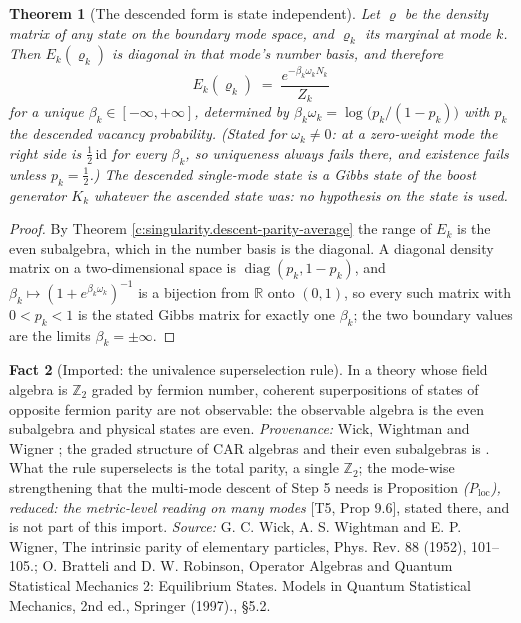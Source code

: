 \documentclass[11pt]{article}
\newtheorem{theorem}{Theorem}[section]
\theoremstyle{definition}
\newtheorem{fact}[theorem]{Fact}
\theoremstyle{plain}
\providecommand{\R}{}\renewcommand{\R}{\mathbb{R}}
\begin{document}
\begin{theorem}[The descended form is state independent]\label{c:singularity.descended-form-state-independent}
Let $\varrho$ be the density matrix of \emph{any} state on the boundary mode space, and $\varrho_k$ its marginal at mode $k$. Then $E_k(\varrho_k)$ is diagonal in that mode's number basis, and therefore
\[
E_k(\varrho_k) \;=\; \frac{e^{-\beta_k \omega_k N_k}}{Z_k}
\]
for a unique $\beta_k \in [-\infty, +\infty]$, determined by $\beta_k\omega_k = \log\bigl(p_k/(1-p_k)\bigr)$ with $p_k$ the descended vacancy probability. (Stated for $\omega_k \neq 0$: at a zero-weight mode the right side is $\tfrac12\,\mathrm{id}$ for every $\beta_k$, so uniqueness always fails there, and existence fails unless $p_k = \tfrac12$.) The descended single-mode state is a Gibbs state of the boost generator $K_k$ whatever the ascended state was: no hypothesis on the state is used.
\end{theorem}
\begin{proof}
By Theorem \ref{c:singularity.descent-parity-average} the range of $E_k$ is the even subalgebra, which in the number basis is the diagonal. A diagonal density matrix on a two-dimensional space is $\operatorname{diag}(p_k, 1 - p_k)$, and $\beta_k \mapsto (1 + e^{\beta_k\omega_k})^{-1}$ is a bijection from $\R$ onto $(0,1)$, so every such matrix with $0 < p_k < 1$ is the stated Gibbs matrix for exactly one $\beta_k$; the two boundary values are the limits $\beta_k = \pm\infty$.

\end{proof}

\begin{fact}[Imported: the univalence superselection rule]\label{c:singularity.imported-univalence-superselection-rule}
In a theory whose field algebra is $\mathbb{Z}_2$ graded by fermion number, coherent superpositions of states of opposite fermion parity are not observable: the observable algebra is the even subalgebra and physical states are even. \emph{Provenance:} Wick, Wightman and Wigner \cite{WWW1952}; the graded structure of CAR algebras and their even subalgebras is \cite[\S 5.2]{BR2}. What the rule superselects is the total parity, a single $\mathbb{Z}_2$; the mode-wise strengthening that the multi-mode descent of Step 5 needs is Proposition \emph{(P$_{\mathrm{loc}}$), reduced: the metric-level reading on many modes} [T5, Prop 9.6], stated there, and is not part of this import.
\emph{Source:} G. C. Wick, A. S. Wightman and E. P. Wigner, The intrinsic parity of elementary particles, Phys. Rev. 88 (1952), 101--105.; O. Bratteli and D. W. Robinson, Operator Algebras and Quantum Statistical Mechanics 2: Equilibrium States. Models in Quantum Statistical Mechanics, 2nd ed., Springer (1997)., \S 5.2.
\end{fact}
\end{document}
